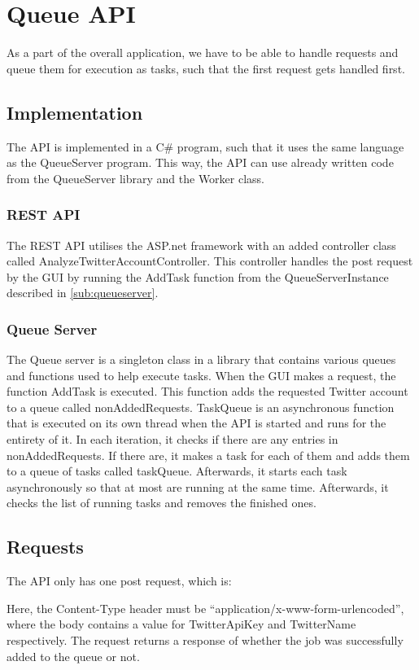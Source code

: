 \chapter{Queue \ac{API}}
As a part of the overall application, we have to be able to handle requests
and queue them for execution as tasks, such that the first request gets handled
first.

\section{Implementation}
The \ac{API} is implemented in a C\# program, such that it uses the same
language as the QueueServer program. This way, the \ac{API} can use already
written code from the QueueServer library and the Worker class.

\subsection{\ac{REST} \ac{API}}
The \ac{REST} \ac{API} utilises the ASP.net framework with an added controller
class called AnalyzeTwitterAccountController. This controller handles the post
request by the GUI by running the AddTask function from the QueueServerInstance
described in \autoref{sub:queueserver}.

\subsection{Queue Server} \label{sub:queueserver}
The Queue server is a singleton class in a library that contains various
queues and functions used to help execute tasks. When the GUI makes a request,
the function AddTask is executed. This function adds the requested Twitter
account to a queue called nonAddedRequests. TaskQueue is an asynchronous
function that is executed on its own thread when the \ac{API} is started and runs for
the entirety of it. In each iteration, it checks if there are any entries in
nonAddedRequests. If there are, it makes a task for each of them and adds them
to a queue of tasks called taskQueue. Afterwards, it starts each task
asynchronously so that at most 
are running at the same time. Afterwards, it checks the list of
running tasks and removes the finished ones.


\section{Requests}
The \ac{API} only has one post request, which is: \nl

\nl

Here, the Content-Type header must be ``application/x-www-form-urlencoded'',
where the body contains a value for TwitterApiKey and TwitterName
respectively.
The request returns a response of whether the job was successfully added to the
queue or not.



